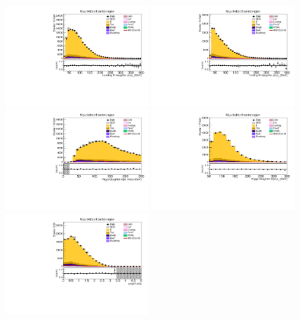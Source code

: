 \begin{figure}[tbp]
  \begin{center}
    \includegraphics[width=0.48\textwidth]{figures/wlnhbb2016/resolved/WmnWH2TopCR_Hbjet1Pt.pdf}
    \includegraphics[width=0.48\textwidth]{figures/wlnhbb2016/resolved/WmnWH2TopCR_Hbjet2Pt.pdf}
    \includegraphics[width=0.48\textwidth]{figures/wlnhbb2016/resolved/WmnWH2TopCR_mH.pdf}
    \includegraphics[width=0.48\textwidth]{figures/wlnhbb2016/resolved/WmnWH2TopCR_pTH.pdf}
    \includegraphics[width=0.48\textwidth]{figures/wlnhbb2016/resolved/WmnWH2TopCR_dEtab1b2.pdf}

\end{center}
\end{figure}
